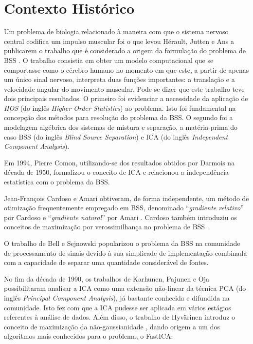 \label{chap:2}

\section{Contexto Histórico}

    Um problema de biologia relacionado à maneira com que o sistema nervoso central codifica um impulso muscular foi o que levou Hérault, Jutten e Ans a publicarem o trabalho que é considerado a origem da formulação do problema de BSS \cite{french}. O trabalho consistia em obter um modelo computacional que se comportasse como o cérebro humano no momento em que este, a partir de apenas um único sinal nervoso, interpreta duas funções importantes: a translação e a velocidade angular do movimento muscular. Pode-se dizer que este trabalho teve dois principais resultados. O primeiro foi evidenciar a necessidade da aplicação de \textit{HOS} (do inglês \textit{Higher Order Statistics}) ao problema. Isto foi fundamental na concepção dos métodos para resolução do problema da BSS. O segundo foi a modelagem algébrica dos sistemas de mistura e separação, a matéria-prima do caso BSS (do inglês \textit{Blind Source Separation}) e ICA (do inglês \textit{Independent Component Analysis}).


    Em 1994, Pierre Comon, utilizando-se dos resultados obtidos por Darmois na década de 1950, formalizou o conceito de ICA e relacionou a independência estatística com o problema da BSS. \cite{Comon}
    
    
    Jean-François Cardoso e Amari obtiveram, de forma independente, um método de otimização frequentemente empregado em BSS, denominado ``\textit{gradiente relativo}'' por Cardoso \cite{easi} e ``\textit{gradiente natural}'' por Amari \cite{Riemenn}. Cardoso também introduziu os conceitos de maximização por verossimilhança no problema de BSS \cite{ICA3}.
    
    
    O trabalho de Bell e Sejnowski \cite{ICAML} popularizou o problema da BSS na comunidade de processamento de sinais devido à sua simplicade de implementação combinada com a capacidade de separar uma quantidade considerável de fontes.
    
    No fim da década de 1990, os trabalhos de Karhunen, Pajunen e Oja \cite{ICA} possibilitaram analisar a ICA como uma extensão não-linear da técnica PCA (do inglês \textit{Principal Component Analysis}), já bastante conhecida e difundida na comunidade. Isto fez com que a ICA pudesse ser aplicada em vários estágios referentes à análise de dados. Além disso,  o trabalho de  Hyvärinen introduz o conceito de maximização da não-gaussianidade \cite{ICAML}, dando origem a um dos algoritmos mais conhecidos para o problema, o FastICA.
    
